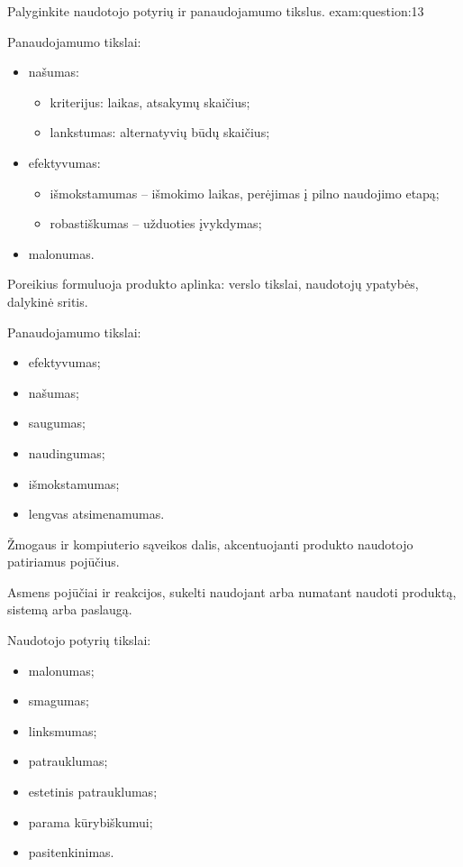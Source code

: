 \begin{question}{%
  Palyginkite naudotojo potyrių ir panaudojamumo tikslus.
  }{exam:question:13}

  Panaudojamumo tikslai\cite[20--]{skaidres-5}:
  \begin{itemize}
    \item našumas:
      \begin{itemize}
        \item kriterijus: laikas, atsakymų skaičius;
        \item lankstumas: alternatyvių būdų skaičius;
      \end{itemize}
    \item efektyvumas:
      \begin{itemize}
        \item išmokstamumas – išmokimo laikas, perėjimas į pilno naudojimo
          etapą;
        \item robastiškumas – užduoties įvykdymas;
      \end{itemize}
    \item malonumas.
  \end{itemize}
  Poreikius formuluoja produkto aplinka: verslo tikslai, naudotojų ypatybės,
  dalykinė sritis.

  Panaudojamumo tikslai\cite[47p.]{konspektas}:
  \begin{itemize}
    \item efektyvumas;
    \item našumas;
    \item saugumas;
    \item naudingumas;
    \item išmokstamumas;
    \item lengvas atsimenamumas.
  \end{itemize}

  \begin{defn}
    Žmogaus ir kompiuterio sąveikos dalis, akcentuojanti produkto naudotojo
    patiriamus pojūčius.
    \cite[3]{skaidres-7}
  \end{defn}

  \begin{defn}
    Asmens pojūčiai ir reakcijos, sukelti naudojant arba numatant naudoti
    produktą, sistemą arba paslaugą.\cite[4]{skaidres-7}
  \end{defn}

  Naudotojo potyrių tikslai\cite[3]{skaidres-7}:
  \begin{itemize}
    \item malonumas;
    \item smagumas;
    \item linksmumas;
    \item patrauklumas;
    \item estetinis patrauklumas;
    \item parama kūrybiškumui;
    \item pasitenkinimas.
  \end{itemize}
\end{question}

